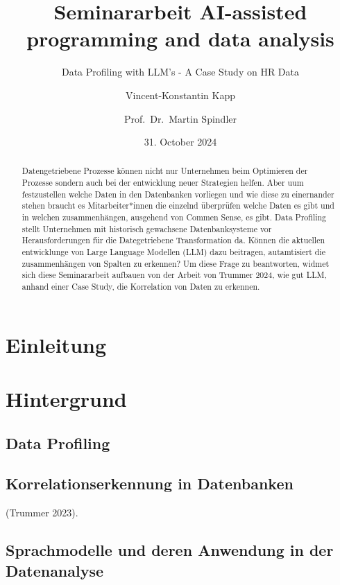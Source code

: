 \documentclass[
  11pt,
]{article}
\title{Seminararbeit AI-assisted programming and data analysis}
\subtitle{Data Profiling with LLM's - A Case Study on HR Data}
\author{Vincent-Konstantin Kapp \and Prof.~Dr.~Martin Spindler}
\date{31. October 2024}
\begin{document}
\maketitle
\begin{abstract}
Datengetriebene Prozesse können nicht nur Unternehmen beim Optimieren
der Prozesse sondern auch bei der entwicklung neuer Strategien helfen.
Aber uum festzustellen welche Daten in den Datenbanken vorliegen und wie
diese zu einernander stehen braucht es Mitarbeiter*innen die einzelnd
überprüfen welche Daten es gibt und in welchen zusammenhängen, ausgehend
von Commen Sense, es gibt. Data Profiling stellt Unternehmen mit
historisch gewachsene Datenbanksysteme vor Herausforderungen für die
Dategetriebene Transformation da. Können die aktuellen entwicklunge von
Large Language Modellen (LLM) dazu beitragen, autamtisiert die
zusammenhängen von Spalten zu erkennen? Um diese Frage zu beantworten,
widmet sich diese Seminararbeit aufbauen von der Arbeit von Trummer
2024, wie gut LLM, anhand einer Case Study, die Korrelation von Daten zu
erkennen.
\end{abstract}

\section{Einleitung}\label{einleitung}

\section{Hintergrund}\label{hintergrund}

\subsection{Data Profiling}\label{data-profiling}

\subsection{Korrelationserkennung in
Datenbanken}\label{korrelationserkennung-in-datenbanken}

(Trummer 2023).

\subsection{Sprachmodelle und deren Anwendung in der
Datenanalyse}\label{sprachmodelle-und-deren-anwendung-in-der-datenanalyse}
\end{document}
